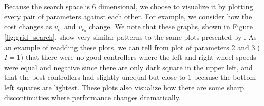 \documentclass[conference]{IEEEtran}
\begin{document}
    Because the search space is 6 dimensional, we choose to visualize it by plotting every pair of parameters against each other. For example, we consider how the cost changes as $v_{l_0}$ and $v_{r_0}$ change. We note that these graphs, shown in Figure \ref{fig:grid_search}, show very similar patterns to the same plots presented by \cite{gauci_self-organized_2014}. As an example of readding these plots, we can tell from plot of parameters 2 and 3 ($I=1$) that there were no good controllers where the left and right wheel speeds were equal and negative since there are only dark square in the upper left, and that the best controllers had slightly unequal but close to 1 because the bottom left squares are lightest. These plots also visualize how there are some sharp discontinuities where performance changes dramatically.
\end{document}
